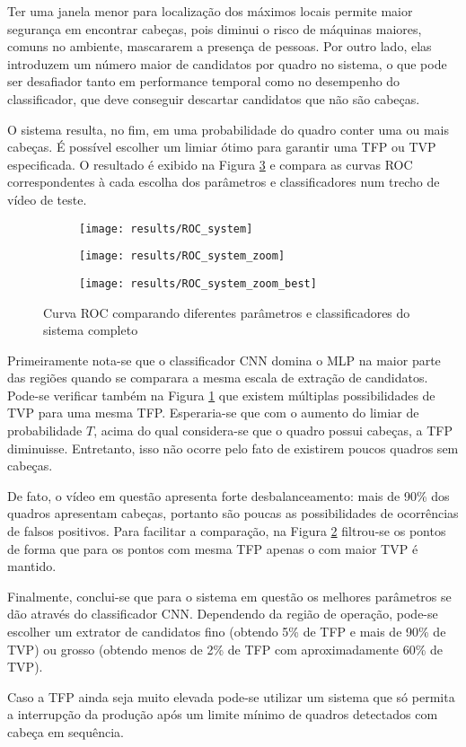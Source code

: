 Ter uma janela menor para localização dos máximos locais permite maior segurança em encontrar cabeças, pois diminui o risco de máquinas maiores, comuns no ambiente, mascararem a presença de pessoas. Por outro lado, elas introduzem um número maior de candidatos por quadro no sistema, o que pode ser desafiador tanto em performance temporal como no desempenho do classificador, que deve conseguir descartar candidatos que não são cabeças.

O sistema resulta, no fim, em uma probabilidade do quadro conter uma ou mais cabeças. É possível escolher um limiar ótimo para garantir uma TFP ou TVP especificada. O resultado é exibido na Figura \ref{fig:ROC-system} e compara as curvas ROC correspondentes à cada escolha dos parâmetros e classificadores num trecho de vídeo de teste.

\begin{figure}
\centering
\begin{subfigure}{0.5\textwidth}
  \centering
  \texttt{[image: results/ROC\_system]}
  \caption{}
\end{subfigure}%
\begin{subfigure}{.5\textwidth}
  \centering
  \texttt{[image: results/ROC\_system\_zoom]}
  \caption{}
  \label{fig:ROC-system:zoom}
\end{subfigure}
\begin{subfigure}{.5\textwidth}
  \centering
  \texttt{[image: results/ROC\_system\_zoom\_best]}
  \caption{}
  \label{fig:ROC-system:zoom_best}
\end{subfigure}
\caption{Curva ROC comparando diferentes parâmetros e classificadores do sistema completo}
\label{fig:ROC-system}
\end{figure}

Primeiramente nota-se que o classificador CNN domina o MLP na maior parte das regiões quando se comparara a mesma escala de extração de candidatos. Pode-se verificar também na Figura \ref{fig:ROC-system:zoom} que existem múltiplas possibilidades de TVP para uma mesma TFP. 
Esperaria-se que com o aumento do limiar de probabilidade $T$, acima do qual considera-se que o quadro possui cabeças, a TFP diminuisse. Entretanto, isso não ocorre pelo fato de existirem poucos quadros sem cabeças.

De fato, o vídeo em questão apresenta forte desbalanceamento: mais de 90\% dos quadros apresentam cabeças, portanto são poucas as possibilidades de ocorrências de falsos positivos. Para facilitar a comparação, na Figura \ref{fig:ROC-system:zoom_best} filtrou-se os pontos de forma que para os pontos com mesma TFP apenas o com maior TVP é mantido.

Finalmente, conclui-se que para o sistema em questão os melhores parâmetros se dão através do classificador CNN. Dependendo da região de operação, pode-se escolher um extrator de candidatos fino (obtendo 5\% de TFP e mais de 90\% de TVP) ou grosso (obtendo menos de 2\% de TFP com aproximadamente 60\% de TVP). 

Caso a TFP ainda seja muito elevada pode-se utilizar um sistema que só permita a interrupção da produção após um limite mínimo de quadros detectados com cabeça em sequência.


